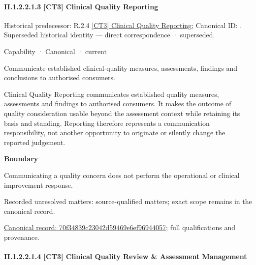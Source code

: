 \paragraph*{II.1.2.2.1.3 [CT3] Clinical Quality Reporting}
\label{navigation:II.1.2.2.1.3}

{\small Historical predecessor: R.2.4 \hyperref[element:e5812fcdf3f5465b9b1d8ba536075c5f]{[CT3] Clinical Quality Reporting}; Canonical ID: \texttt{}. Superseded historical identity — direct correspondence · superseded.}\par
\label{element:70f34839c23042d59469e6ef96944057}
{\small Capability · Canonical · current}\par

Communicate established clinical-quality measures, assessments, findings and conclusions to authorised consumers.



Clinical Quality Reporting communicates established quality measures, assessments and findings to authorised consumers. It makes the outcome of quality consideration usable beyond the assessment context while retaining its basis and standing. Reporting therefore represents a communication responsibility, not another opportunity to originate or silently change the reported judgement.



\textbf{Boundary}



Communicating a quality concern does not perform the operational or clinical improvement response.


{\small Recorded unresolved matters: source-qualified matters; exact scope remains in the canonical record.}\par
{\footnotesize \href{../../../../continuum/strategy/capability/70f34839c23042d59469e6ef96944057.md}{Canonical record: 70f34839c23042d59469e6ef96944057}; full qualifications and provenance.}\par
\paragraph*{II.1.2.2.1.4 [CT3] Clinical Quality Review \& Assessment Management}
\label{navigation:II.1.2.2.1.4}

